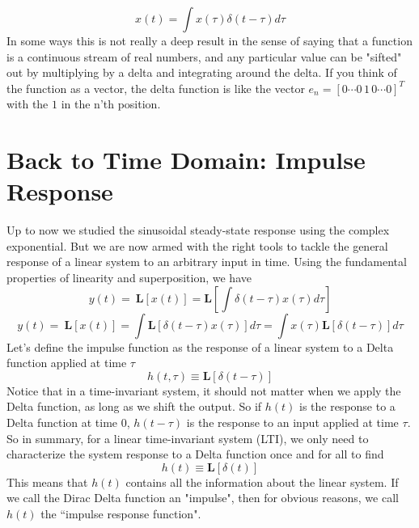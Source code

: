     \begin{equation}
        x\left(t\right)=\int x\left(\tau\right)\delta\left(t-\tau\right)d\tau
    \end{equation}
In some ways this is not really a deep result in the sense of  saying that a function is a continuous stream of real numbers, and any particular value can be "sifted" out by multiplying by a delta and integrating around the delta.  If you think of the function as a vector, the delta function is like the vector $e_n = [0 \cdots 0\, 1\, 0 \cdots 0 ]^T$ with the $1$ in the n'th position. 
\section{Back to Time Domain:  Impulse Response}
Up to now we studied the sinusoidal steady-state response using the complex exponential.  But we are now armed with the right tools to tackle the general response of a linear system to an arbitrary input in time.  Using the fundamental properties of linearity and superposition, we have
    \begin{equation}
        y\left(t\right)=\ \mathbf{L}\left[x\left(t\right)\right]=\mathbf{L}\left[\int\delta\left(t-\tau\right)x\left(\tau\right)d\tau\right]
    \end{equation}
    \begin{equation}
        y\left(t\right)=\ \mathbf{L}\left[x\left(t\right)\right]=\int \mathbf{L}\left[\delta\left(t-\tau\right)x\left(\tau\right)\right]d\tau= \int x\left(\tau\right)\mathbf{L}\left[\delta\left(t-\tau\right)\right]d\tau
    \end{equation}
Let's define the impulse function as the response of a linear system to a Delta function applied at time $\tau$
    \begin{equation}
        h(t,\tau) \equiv  \mathbf{L}[\delta(t-\tau)]
    \end{equation}
Notice that in a time-invariant system, it should not matter when we apply the Delta function, as long as we shift the output.  So if $h(t)$ is the response to a Delta function at time 0, $h(t-\tau)$ is the response to an input applied at time $\tau$.  So in summary, for a linear time-invariant system (LTI), we only need to characterize the system response to a Delta function once and for all to find
    \begin{equation}
        h(t) \equiv  \mathbf{L}[\delta(t)]
    \end{equation}
This means that $h(t)$ contains all the information about the linear system. If we call the Dirac Delta function an "impulse", then for obvious reasons, we call $h(t)$ the ``impulse response function". 
